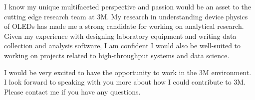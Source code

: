 \documentclass[11pt,a4paper,roman]{moderncv}        %
\newcommand{\company}{3M}
\newcommand{\shortcompany}{3M}
\begin{document}
I know my unique multifaceted perspective and passion would be an asset to the cutting edge research team at \company{}.
My research in understanding device physics of OLEDs has made me a strong candidate for working on analytical research. 
Given my experience with designing laboratory equipment and writing data collection and analysis software, I am confident I would also be well-suited to working on projects related to high-throughput systems and data science.

I would be very excited to have the opportunity to work in the \shortcompany{}  environment.
I look forward to speaking with you more about how I could contribute to \company{}.
Please contact me if you have any questions.



\makeletterclosing
\end{document}
